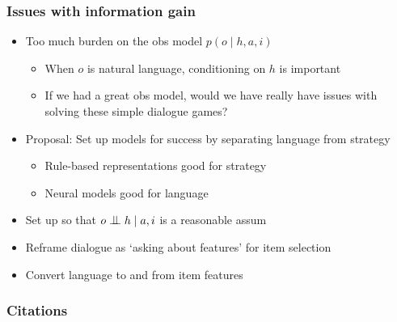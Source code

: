 \documentclass{beamer}
\newcommand{\bigCI}{\mathrel{\text{\scalebox{1.07}{$\perp\mkern-10mu\perp$}}}}
\begin{document}
\begin{frame}
\frametitle{Issues with information gain}
\begin{itemize}
\item Too much burden on the obs model $p(o \mid h,a,i)$
    \begin{itemize}
    \item When $o$ is natural language, conditioning on $h$ is important
    \item If we had a great obs model, would we have really have issues
        with solving these simple dialogue games?
    \end{itemize}
\item Proposal: Set up models for success by separating language from strategy
    \begin{itemize}
    \item Rule-based representations good for strategy
    \item Neural models good for language
    \end{itemize}
\item Set up so that $o \bigCI h \mid a,i$ is a reasonable assum
\item Reframe dialogue as `asking about features' for item selection
\item Convert language to and from item features
\end{itemize}
\end{frame}



\begin{frame}[allowframebreaks]
\frametitle{Citations}

\end{frame}
\end{document}
